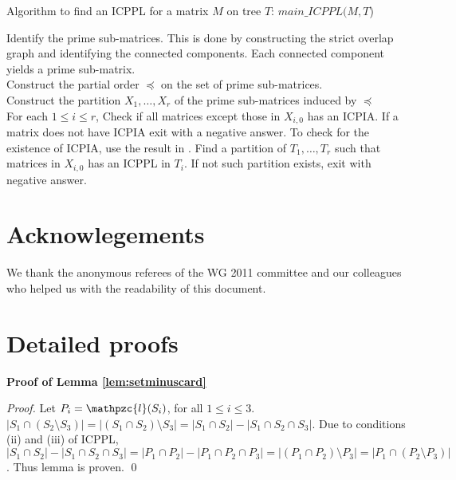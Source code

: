 \documentclass{fsttcs}
\def\cl{\mathpzc{l}}
\begin{document}
\begin{algorithm}[h]
\caption{Algorithm to find an ICPPL for a matrix $M$ on tree $T$: $main\_ICPPL(M, T$)}
\label{Al:icppa-main}
\begin{algorithmic}
\STATE Identify the prime sub-matrices. This is done by constructing
the strict overlap graph and identifying the connected components. Each
connected component yields a prime sub-matrix.   \\ 
\STATE Construct the partial order $\preccurlyeq$ on the set of prime
sub-matrices.  \\ 
\STATE Construct the partition $X_1,\ldots,X_r$ of the  prime
sub-matrices induced by $\preccurlyeq$ \\
\STATE For each $1 \leq i \leq r$, Check if all matrices except those
in $X_{i,0}$ has an ICPIA.  If a matrix does not have ICPIA exit with
a negative answer.  To check for the existence of ICPIA, use the
result in \cite{nsnrs09}. 
\label{l:icppasubtree} \STATE  Find a partition of $T_1, \ldots, T_r$ such that matrices in
$X_{i,0}$ has an ICPPL in $T_i$.  If not such 
partition exists, exit with negative answer.  
\end{algorithmic}
\end{algorithm}




\section {Acknowlegements} 
We thank the anonymous referees of the WG 2011 committee and our
colleagues who helped us with the readability of this document.


%



\pagebreak
\appendix

\section{Detailed proofs}
{\bf Proof of Lemma \ref{lem:setminuscard}}\\
\begin{proof}
  Let $P_i = \cl(S_i)$, for all $1 \le i \le  3$.
  $|S_1 \cap (S_2 \setminus S_3)| = |(S_1 \cap S_2) \setminus S_3| =
  |S_1 \cap S_2| - |S_1 \cap S_2 \cap S_3|$. Due to conditions (ii)
  and (iii) of ICPPL, $|S_1 \cap S_2| - |S_1 \cap S_2 \cap S_3| = |P_1
  \cap P_2| - |P_1 \cap P_2 \cap P_3| = |(P_1 \cap P_2) \setminus P_3|
  = |P_1 \cap (P_2 \setminus P_3)|$. Thus lemma is proven. \qed
\end{proof}
\end{document}
